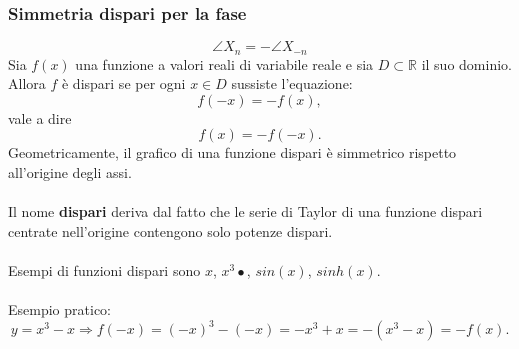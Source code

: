 \documentclass[12pt,oneside,openany]{memoir}
\numberwithin{equation}{subsection}
\begin{document}
\subsubsection{Simmetria dispari per la fase}
\begin{equation}
	\angle X_n = - \angle X_{-n}
\end{equation}
Sia $f(x)$ una funzione a valori reali di variabile reale e sia $D \subset \mathbb{R}$ il suo dominio. Allora $f$ \`e dispari se per ogni $x \in D$ sussiste l'equazione:
\[
	f(-x) = - f(x),
\]
vale a dire
\[
	f(x) = - f(-x).
\]
Geometricamente, il grafico di una funzione dispari \`e simmetrico rispetto all'origine degli assi.\\
\\
Il nome \textbf{dispari} deriva dal fatto che le serie di Taylor di una funzione dispari centrate nell'origine contengono solo potenze dispari.\\
\\
Esempi di funzioni dispari sono $x$, $x^3•$, $sin(x)$, $sinh(x)$.\\
\\
Esempio pratico:
\[
	y = x^3 - x \Longrightarrow f(-x) = (-x)^3 - (-x) = -x^3 + x = -(x^3 - x) = -f(x).
\]

\newpage
\end{document}
